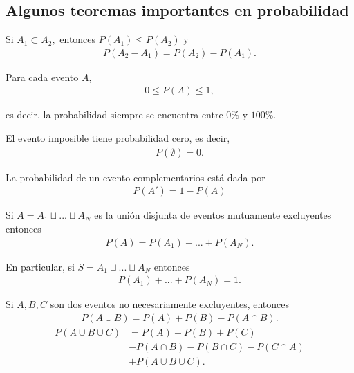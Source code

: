 \subsection{Algunos teoremas importantes en probabilidad}
{}
	\begin{thm}
	 \label{thm:1.1}
	 Si $A_{1}\subset A_{2},$ entonces $P(A_{1})\leq P(A_{2})$ y
	 \begin{align*}
		P(A_{2}-A_{1})=P(A_{2})-P(A_{1}).
\end{align*}
	\end{thm}


{}
\begin{thm}
 \label{thm:1.2}
 Para cada evento $A$,
 \begin{align}
  \label{1.5}
  0\leq P(A) \leq 1,
 \end{align}

es decir, la probabilidad siempre se encuentra entre $0\%$ y $100\%.$
\end{thm}


\begin{thm}
	\label{thm:1.3}
 El evento imposible tiene probabilidad cero, es decir,
 \begin{align}
  P(\emptyset)=0.
 \end{align}
\end{thm}


{}
\begin{thm}
 \label{thm:1.4} La probabilidad de un evento complementarios está dada por
 \begin{align}
 \label{1.7}
   P(A')=1-P(A)
  \end{align}
\end{thm}


{}
\begin{thm}
 \label{thm:1.5} Si $A=A_{1}\sqcup...\sqcup A_{N}$ es la unión disjunta de eventos mutuamente excluyentes entonces
 \begin{align}
 \label{1.8}
P(A)=P(A_{1})+...+P(A_{N}).
\end{align}


En particular, si $S=A_{1}\sqcup...\sqcup A_{N}$ entonces
 \begin{align}
 \label{1.9}
P(A_{1})+...+P(A_{N})=1.
\end{align}
\end{thm}


{}
\begin{thm}
 \label{thm:1.6}
  Si $A,B,C$ son dos eventos no necesariamente excluyentes, entonces
 \begin{align}
   \label{1.10}
   P(A\cup B)=P(A)+P(B)-P(A\cap B).
 \end{align}
 \begin{align}
 \label{1.11}
	P(A\cup B \cup C)&=P(A)+P(B)+P(C)\\
	&-P(A\cap B)-P(B\cap C)-P(C\cap A)\\
	&+P(A\cup B \cup C).
\end{align}
\end{thm}



